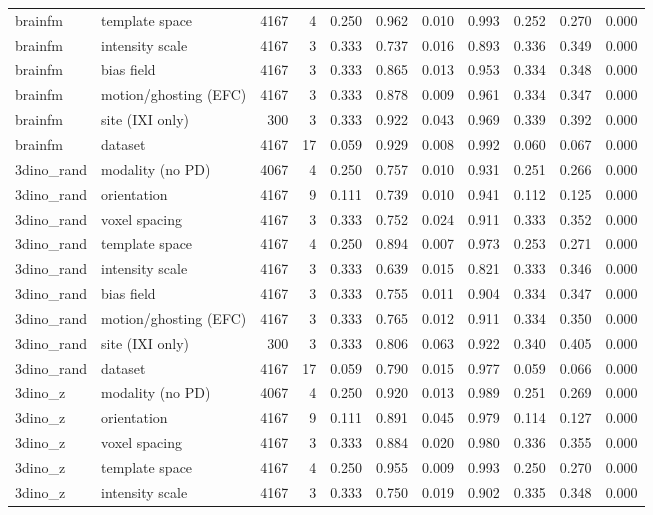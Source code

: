\begin{tabular}{llrrrrrrrrr}
brainfm & template space & 4167 & 4 & 0.250 & 0.962 & 0.010 & 0.993 & 0.252 & 0.270 & 0.000 \\
brainfm & intensity scale & 4167 & 3 & 0.333 & 0.737 & 0.016 & 0.893 & 0.336 & 0.349 & 0.000 \\
brainfm & bias field & 4167 & 3 & 0.333 & 0.865 & 0.013 & 0.953 & 0.334 & 0.348 & 0.000 \\
brainfm & motion/ghosting (EFC) & 4167 & 3 & 0.333 & 0.878 & 0.009 & 0.961 & 0.334 & 0.347 & 0.000 \\
brainfm & site (IXI only) & 300 & 3 & 0.333 & 0.922 & 0.043 & 0.969 & 0.339 & 0.392 & 0.000 \\
brainfm & dataset & 4167 & 17 & 0.059 & 0.929 & 0.008 & 0.992 & 0.060 & 0.067 & 0.000 \\
3dino\_rand & modality (no PD) & 4067 & 4 & 0.250 & 0.757 & 0.010 & 0.931 & 0.251 & 0.266 & 0.000 \\
3dino\_rand & orientation & 4167 & 9 & 0.111 & 0.739 & 0.010 & 0.941 & 0.112 & 0.125 & 0.000 \\
3dino\_rand & voxel spacing & 4167 & 3 & 0.333 & 0.752 & 0.024 & 0.911 & 0.333 & 0.352 & 0.000 \\
3dino\_rand & template space & 4167 & 4 & 0.250 & 0.894 & 0.007 & 0.973 & 0.253 & 0.271 & 0.000 \\
3dino\_rand & intensity scale & 4167 & 3 & 0.333 & 0.639 & 0.015 & 0.821 & 0.333 & 0.346 & 0.000 \\
3dino\_rand & bias field & 4167 & 3 & 0.333 & 0.755 & 0.011 & 0.904 & 0.334 & 0.347 & 0.000 \\
3dino\_rand & motion/ghosting (EFC) & 4167 & 3 & 0.333 & 0.765 & 0.012 & 0.911 & 0.334 & 0.350 & 0.000 \\
3dino\_rand & site (IXI only) & 300 & 3 & 0.333 & 0.806 & 0.063 & 0.922 & 0.340 & 0.405 & 0.000 \\
3dino\_rand & dataset & 4167 & 17 & 0.059 & 0.790 & 0.015 & 0.977 & 0.059 & 0.066 & 0.000 \\
3dino\_z & modality (no PD) & 4067 & 4 & 0.250 & 0.920 & 0.013 & 0.989 & 0.251 & 0.269 & 0.000 \\
3dino\_z & orientation & 4167 & 9 & 0.111 & 0.891 & 0.045 & 0.979 & 0.114 & 0.127 & 0.000 \\
3dino\_z & voxel spacing & 4167 & 3 & 0.333 & 0.884 & 0.020 & 0.980 & 0.336 & 0.355 & 0.000 \\
3dino\_z & template space & 4167 & 4 & 0.250 & 0.955 & 0.009 & 0.993 & 0.250 & 0.270 & 0.000 \\
3dino\_z & intensity scale & 4167 & 3 & 0.333 & 0.750 & 0.019 & 0.902 & 0.335 & 0.348 & 0.000 \\

\end{tabular}
